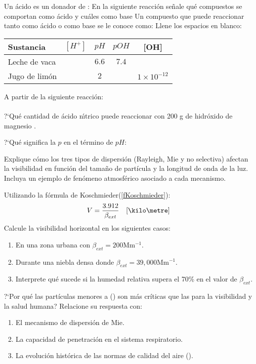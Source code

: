 \begin{exercises}
\exer Un \'acido es un donador de :\hrulefill
\exer En la siguiente reacci\'on se\~nale qu\'e compuestos se comportan como \'acido y cu\'ales como base 
\exer Un compuesto que puede reaccionar tanto como \'acido o como base se le conoce como:\hrulefill
\exer Llene los espacios en blanco:\\
\begin{tabular}{l|c|c|c|c}
Sustancia & $[H^+]$ & $pH$ & $pOH$ & [OH]\\ \hline
Leche de vaca &    & $6.6$ &$7.4$ &  \\
\hline Jugo de lim\'on & &$2$ & &$1\times10^{-12}$ \\
\hline 
\end{tabular}
\exer A partir de la siguiente reacci\'on:\\\vskip 3pt \\ \vskip 3pt ?`Qu\'e cantidad de \'acido n\'{\i}trico  puede reaccionar con 200 g de hidr\'oxido de magnesio . 

\exer ?`Qu\'e significa la $p$ en el t\'ermino de $pH$:
\hrulefill

\exer Explique cómo los tres tipos de dispersión (Rayleigh, Mie y no selectiva) afectan la visibilidad en función del tamaño de partícula y la longitud de onda de la luz. Incluya un ejemplo de fenómeno atmosférico asociado a cada mecanismo.

\exer Utilizando la fórmula de Koschmieder(\ref{fKoschmieder}): 
\begin{equation*}
V=\frac{3.912}{\beta_{ext}}  \quad [\kilo\metre]
\end{equation*}
Calcule la visibilidad horizontal en los siguientes casos:
\begin{enumerate}
\item En una zona urbana con $\beta_{ext}=200 $Mm$^{-1}$.
\item Durante una niebla densa donde $\beta_{ext}=39,000 $Mm$^{-1}$.
\item Interprete qué sucede si la humedad relativa supera el 70\% en el valor de $\beta_{ext}$.
\end{enumerate}

\exer ?`Por qué las partículas menores a () son más críticas que las  para la visibilidad y la salud humana? Relacione su respuesta con:
\begin{enumerate}
\item El mecanismo de dispersión de Mie.
\item La capacidad de penetración en el sistema respiratorio.
\item La evolución histórica de las normas de calidad del aire (). 
\end{enumerate}

\end{exercises}

